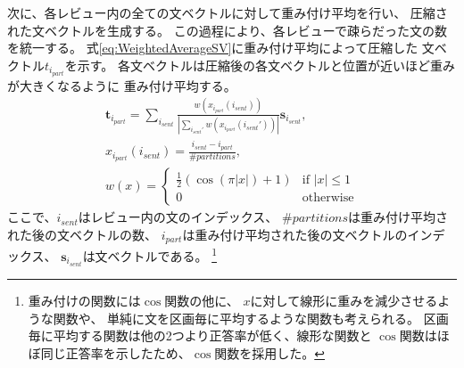 次に、各レビュー内の全ての文ベクトルに対して重み付け平均を行い、
圧縮された文ベクトルを生成する。
この過程により、各レビューで疎らだった文の数を統一する。
式\ref{eq:WeightedAverageSV}に重み付け平均によって圧縮した
文ベクトル$t_{i_{part}}$を示す。
各文ベクトルは圧縮後の各文ベクトルと位置が近いほど重みが大きくなるように
重み付け平均する。
\begin{gather}
  \mathbf{t}_{i_{part}} = \sum_{i_{sent}}
                          \frac{w(x_{i_{part}}(i_{sent}))}
                               {|\sum_{i_{sent}'} w(x_{i_{part}}(i_{sent}'))|}
                          \mathbf{s}_{i_{sent}},
  \label{eq:WeightedAverageSV} \\
  x_{i_{part}}(i_{sent}) = \frac{i_{sent} - i_{part}}{\#partitions},
  \nonumber \\
  w(x) = \begin{cases}
    \frac{1}{2} (\cos(\pi|x|) + 1) &\text{if $|x| \leq 1$} \\
    0 &\text{otherwise}
  \end{cases} \nonumber
\end{gather}
ここで、$i_{sent}$はレビュー内の文のインデックス、
$\#partitions$は重み付け平均された後の文ベクトルの数、
$i_{part}$は重み付け平均された後の文ベクトルのインデックス、
$\mathbf{s}_{i_{sent}}$は文ベクトルである。
\footnote{重み付けの関数には$\cos$関数の他に、
$x$に対して線形に重みを減少させるような関数や、
単純に文を区画毎に平均するような関数も考えられる。
区画毎に平均する関数は他の2つより正答率が低く、線形な関数と
$\cos$関数はほぼ同じ正答率を示したため、$\cos$関数を採用した。}

